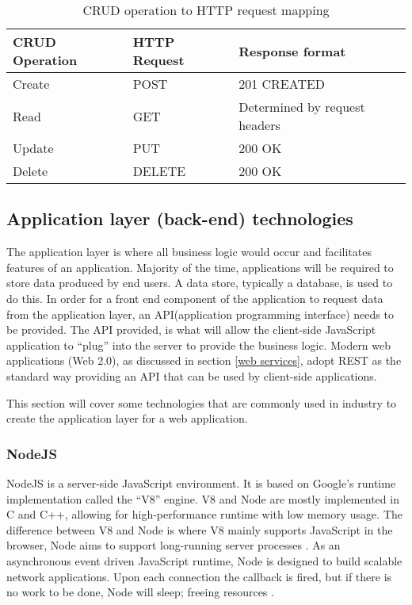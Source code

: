 \begin{table} [ht]
    \begin{center}
        \begin{tabular}{ |l|l|l| }
            \hline
            CRUD Operation & HTTP Request & Response format\\
            \hline
            Create & POST & 201 CREATED\\ 
            Read & GET & Determined by request headers\\  
            Update & PUT & 200 OK \\   
            Delete & DELETE & 200 OK \\
            \hline
        \end{tabular}
        \caption{CRUD operation to HTTP request mapping}
    \end{center}           
\end{table}

\subsection{Application layer (back-end) technologies}
The application layer is where all business logic would occur and facilitates features of an application.
Majority of the time, applications will be required to store data produced by end users. A data store, typically a database, is
used to do this.
In order for a front end component of the application to request data from the application layer, an API(application programming interface) needs
to be provided. The API provided, is what will allow the client-side JavaScript application to ``plug'' into the server to provide the business
logic. 
Modern web applications (Web 2.0), as discussed in section \ref{web services}, adopt REST as the standard way providing an API that can be used
by client-side applications.


This section will cover some technologies that are commonly used in industry to create the application layer for a web application.

\subsubsection{NodeJS}
NodeJS is a server-side JavaScript environment. It is based on Google's runtime implementation called the ``V8'' engine.
V8 and Node are mostly implemented in C and C++, allowing for high-performance runtime with low memory usage.
The difference between V8 and Node is where V8 mainly supports JavaScript in the browser, Node aims to support long-running 
server processes \cite{tilkov2010node}.
As an asynchronous event driven JavaScript runtime, Node is designed to build scalable network applications. 
Upon each connection the callback is fired, but if there is no work to be done, Node will sleep; freeing resources \cite{nodejs2016}.

